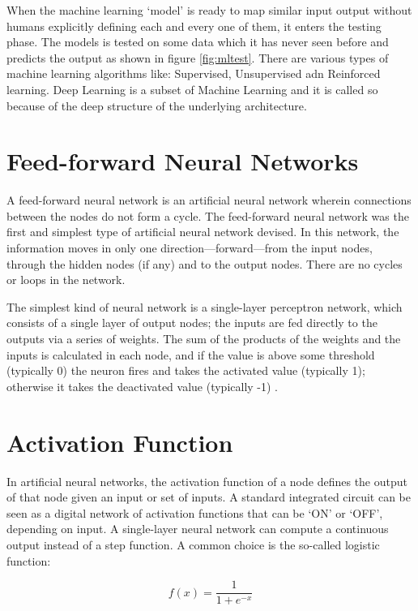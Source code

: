 When the machine learning `model' is ready to map similar input output without humans explicitly defining each and every one of them, it enters the testing phase. The models is tested on some data which it has never seen before and predicts the output as shown in figure \eqref{fig:mltest}. There are various types of machine learning algorithms like: Supervised, Unsupervised adn Reinforced learning. Deep Learning is a subset of Machine Learning and it is called so because of the deep structure of the underlying architecture. 

\section*{Feed-forward Neural Networks}
\label{sec:ffnn}
\hspace{0.5cm} A feed-forward neural network is an artificial neural network wherein connections between the nodes do not form a cycle. The feed-forward neural network was the first and simplest type of artificial neural network devised. In this network, the information moves in only one direction—forward—from the input nodes, through the hidden nodes (if any) and to the output nodes. There are no cycles or loops in the network.

The simplest kind of neural network is a single-layer perceptron network, which consists of a single layer of output nodes; the inputs are fed directly to the outputs via a series of weights. The sum of the products of the weights and the inputs is calculated in each node, and if the value is above some threshold (typically 0) the neuron fires and takes the activated value (typically 1); otherwise it takes the deactivated value (typically -1) \cite{wiki:ffnn}. 

\section*{Activation Function}
\label{sec:actvfnc}
In artificial neural networks, the activation function of a node defines the output of that node given an input or set of inputs. A standard integrated circuit can be seen as a digital network of activation functions that can be `ON' or `OFF', depending on input. A single-layer neural network can compute a continuous output instead of a step function. A common choice is the so-called logistic function:

\[f(x) = \frac{1}{1+e^{-x}}\]

